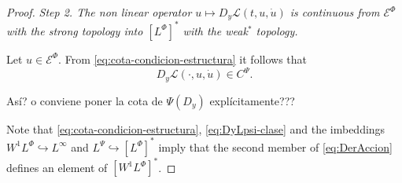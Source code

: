 \documentclass[twoside]{article}
\theoremstyle{remark}
\newcommand{\lphi}{L^{\Phi}}
\newcommand{\lpsi}{L^{\Psi}}
\newcommand{\wphi}{W^{1}\lphi}
\newcommand{\domi}{\mathcal{E}^{\Phi}}
\renewcommand{\leq}{\leqslant}
\begin{document}
\begin{proof}
\noindent\emph{Step 2. The non linear operator   $u
 \mapsto  D_{y}\mathcal{L}(t,u,\dot{u})$ is continuous from $\domi$ with the strong topology  
into $\left[\lphi\right]^*$  with the weak$^*$ topology.}

 Let $u\in \domi$.  From  \eqref{eq:cota-condicion-estructura} it follows that 
\begin{equation}\label{eq:DyLpsi-clase}
D_{y}\mathcal{L}(\cdot,u,\dot{u})\in C^{\Psi}.
\end{equation}

As\'i? o conviene poner la cota de $\Psi(D_y)$ expl\'icitamente???

 Note that \eqref{eq:cota-condicion-estructura},  \eqref{eq:DyLpsi-clase} and the imbeddings $\wphi \hookrightarrow L^{\infty}$ and  
$\lpsi\hookrightarrow  \left[\lphi\right]^*$ imply that the second member of
\eqref{eq:DerAccion} defines an element of $\left[\wphi\right]^*$.




\end{proof}
\end{document}
